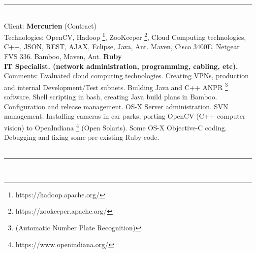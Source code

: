 \documentclass{article}
\let\svthefootnote\thefootnote
\newcommand\Cfootnote[2][black]{\def\thefootnote{\color{#1}\svthefootnote}%
  \footnote{\color{#1}#2}}
\begin{document}

\noindent\hfil\rule{0.5\textwidth}{.4pt}\hfil
\\

%
%


Client: 	\textbf  {Mercurien } (Contract) \\
Technologies: 	OpenCV, Hadoop\Cfootnote[blue]{https://hadoop.apache.org/}, ZooKeeper\Cfootnote[blue]{https://zookeeper.apache.org/}, Cloud Computing technologies, C++, JSON, REST, AJAX, Eclipse, Java, Ant. Maven, Cisco 3400E, Netgear FVS 336.  Bamboo, Maven, Ant. \textbf{Ruby} \\
\textbf{ IT Specialist. (network administration, programming, cabling, etc). } \\
Comments:	Evaluated cloud computing technologies. Creating VPNs, production 
		and internal Development/Test subnets. Building Java and C++ 
ANPR \footnote{(Automatic Number Plate Recognition)} software. Shell scripting in bash, creating Java build plans in Bamboo. Configuration and release management. OS-X Server administration. SVN management.  Installing cameras in car parks, porting OpenCV (C++ computer vision) to OpenIndiana\Cfootnote[blue]{https://www.openindiana.org/} (Open Solaris). Some OS-X Objective-C coding. Debugging and fixing some pre-existing Ruby code. \\
\\

\noindent\hfil\rule{0.5\textwidth}{.4pt}\hfil
\\


\end{document}
